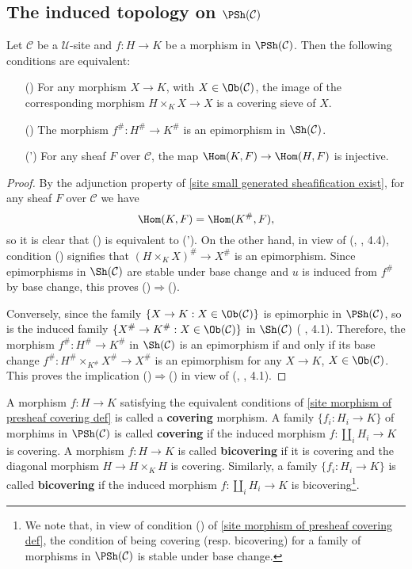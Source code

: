 \subsection{The induced topology on \texorpdfstring{$\PSh(\mathcal{C})$}{Sh}}
\begin{proposition}\label{site morphism of presheaf covering def}
Let $\mathcal{C}$ be a $\mathscr{U}$-site and $f:H\to K$ be a morphism in $\PSh(\mathcal{C})$. Then the following conditions are equivalent:
\begin{enumerate}
\item[(\rmnum{1})] For any morphism $X\to K$, with $X\in\Ob(\mathcal{C})$, the image of the corresponding morphism $H\times_KX\to X$ is a covering sieve of $X$.
\item[(\rmnum{2})] The morphism $f^\#:H^\#\to K^\#$ is an epimorphism in $\Sh(\mathcal{C})$.
\item[(\rmnum{2}')] For any sheaf $F$ over $\mathcal{C}$, the map $\Hom(K,F)\to \Hom(H,F)$ is injective.
\end{enumerate}
\end{proposition}
\begin{proof}
By the adjunction property of \cref{site small generated sheafification exist}, for any sheaf $F$ over $\mathcal{C}$ we have
\[\Hom(K,F)=\Hom(K^\#,F),\]
so it is clear that () is equivalent to ('). On the other hand, in view of (\cite{SGA4-1}, , 4.4), condition () signifies that $(H\times_KX)^\#\to X^\#$ is an epimorphism. Since epimorphisms in $\Sh(\mathcal{C})$ are stable under base change and $u$ is induced from $f^\#$ by base change, this proves ()$\Rightarrow$().\par
Conversely, since the family $\{X\to K:X\in\Ob(\mathcal{C})\}$ is epimorphic in $\PSh(\mathcal{C})$, so is the induced family $\{X^\#\to K^\#:X\in\Ob(\mathcal{C})\}$ in $\Sh(\mathcal{C})$ (\cite{SGA4-1} , 4.1). Therefore, the morphism $f^\#:H^\#\to K^\#$ in $\Sh(\mathcal{C})$ is an epimorphism if and only if its base change $f^\#:H^\#\times_{K^\#}X^\#\to X^\#$ is an epimorphism for any $X\to K$, $X\in\Ob(\mathcal{C})$. This proves the implication ()$\Rightarrow$() in view of (\cite{SGA4-1}, , 4.1).
\end{proof}
A morphism $f:H\to K$ satisfying the equivalent conditions of \cref{site morphism of presheaf covering def} is called a \textbf{covering} morphism. A family $\{f_i:H_i\to K\}$ of morphims in $\PSh(\mathcal{C})$ is called \textbf{covering} if the induced morphism $f:\coprod_iH_i\to K$ is covering. A morphism $f:H\to K$ is called \textbf{bicovering} if it is covering and the diagonal morphism $H\to H\times_KH$ is covering. Similarly, a family $\{f_i:H_i\to K\}$ is called \textbf{bicovering} if the induced morphism $f:\coprod_iH_i\to K$ is bicovering\footnote{We note that, in view of condition () of \cref{site morphism of presheaf covering def}, the condition of being covering (resp. bicovering) for a family of morphisms in $\PSh(\mathcal{C})$ is stable under base change.}.\par
